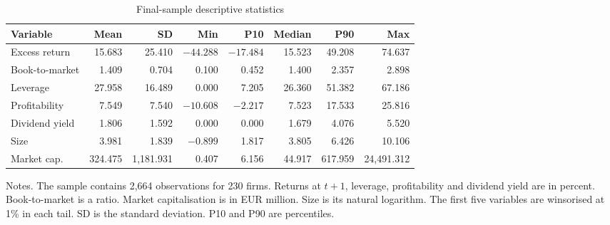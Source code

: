 \begin{table}[H]
  \centering
  \singlespacing
  \caption{Final-sample descriptive statistics}
  \label{tab:descriptive_statistics}
  \begin{tabular}{@{}lrrrrrrr@{}}
    \toprule
    Variable & Mean & SD & Min & P10 & Median & P90 & Max \\
    \midrule
    Excess return & 15.683 & 25.410 & $-44.288$ & $-17.484$ & 15.523 & 49.208 & 74.637 \\
    Book-to-market & 1.409 & 0.704 & 0.100 & 0.452 & 1.400 & 2.357 & 2.898 \\
    Leverage & 27.958 & 16.489 & 0.000 & 7.205 & 26.360 & 51.382 & 67.186 \\
    Profitability & 7.549 & 7.540 & $-10.608$ & $-2.217$ & 7.523 & 17.533 & 25.816 \\
    Dividend yield & 1.806 & 1.592 & 0.000 & 0.000 & 1.679 & 4.076 & 5.520 \\
    Size & 3.981 & 1.839 & $-0.899$ & 1.817 & 3.805 & 6.426 & 10.106 \\
    Market cap. & 324.475 & 1,181.931 & 0.407 & 6.156 & 44.917 & 617.959 & 24,491.312 \\
    \bottomrule
  \end{tabular}

  \medskip
  \begin{minipage}{\textwidth}
    Notes. The sample contains 2,664 observations for 230 firms. Returns at $t+1$, leverage, profitability and dividend yield are in percent. Book-to-market is a ratio. Market capitalisation is in EUR million. Size is its natural logarithm. The first five variables are winsorised at 1\% in each tail. SD is the standard deviation. P10 and P90 are percentiles.
  \end{minipage}
\end{table}
